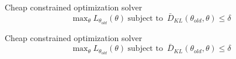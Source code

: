 \documentclass{beamer}
\begin{document}
    

\begin{frame}{Cheap constrained optimization solver}
\begingroup 
\Large
\begin{equation*}
    \text{max}_{\theta} \hspace{3pt} L_{\theta_{old}}(\theta) \hspace{3pt} 
    \text{subject to }  \hspace{2pt} \bar{D}_{KL}\left(\theta_{old}, \theta \right) \leq \delta
\end{equation*}
\endgroup

\end{frame}

\begin{frame}{Cheap constrained optimization solver}
    \begin{equation*}
        \text{max}_{\theta} \hspace{3pt} L_{\theta_{old}}(\theta) \hspace{3pt} 
        \text{subject to }  \hspace{2pt} \bar{D}_{KL}\left(\theta_{old}, \theta \right) \leq \delta
    \end{equation*}
\end{frame}
\end{document}
